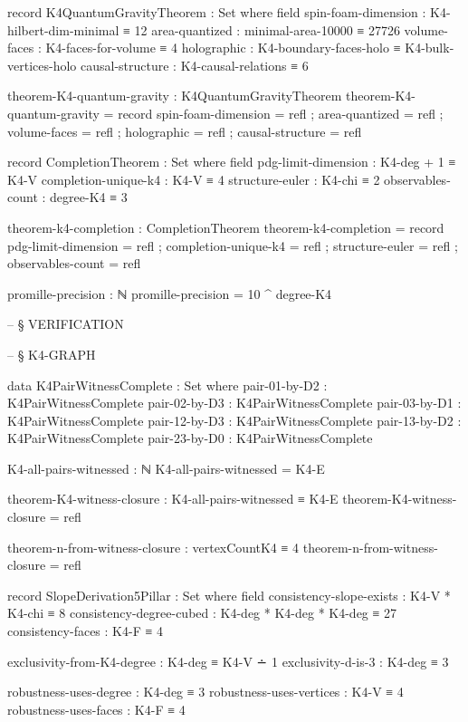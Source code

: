 \documentclass[11pt,a4paper]{book}
\begin{document}
\begin{code}
record K4QuantumGravityTheorem : Set where
  field
    spin-foam-dimension : K4-hilbert-dim-minimal ≡ 12
    area-quantized      : minimal-area-10000 ≡ 27726
    volume-faces        : K4-faces-for-volume ≡ 4
    holographic         : K4-boundary-faces-holo ≡ K4-bulk-vertices-holo
    causal-structure    : K4-causal-relations ≡ 6

theorem-K4-quantum-gravity : K4QuantumGravityTheorem
theorem-K4-quantum-gravity = record
  { spin-foam-dimension = refl
  ; area-quantized      = refl
  ; volume-faces        = refl
  ; holographic         = refl
  ; causal-structure    = refl
  }

record CompletionTheorem : Set where
  field
    pdg-limit-dimension : K4-deg + 1 ≡ K4-V
    completion-unique-k4 : K4-V ≡ 4
    structure-euler : K4-chi ≡ 2
    observables-count : degree-K4 ≡ 3

theorem-k4-completion : CompletionTheorem
theorem-k4-completion = record
  { pdg-limit-dimension = refl
  ; completion-unique-k4 = refl
  ; structure-euler = refl
  ; observables-count = refl
  }

promille-precision : ℕ
promille-precision = 10 ^ degree-K4


-- § VERIFICATION



-- § K4-GRAPH

data K4PairWitnessComplete : Set where
  pair-01-by-D2 : K4PairWitnessComplete
  pair-02-by-D3 : K4PairWitnessComplete
  pair-03-by-D1 : K4PairWitnessComplete
  pair-12-by-D3 : K4PairWitnessComplete
  pair-13-by-D2 : K4PairWitnessComplete
  pair-23-by-D0 : K4PairWitnessComplete

K4-all-pairs-witnessed : ℕ
K4-all-pairs-witnessed = K4-E

theorem-K4-witness-closure : K4-all-pairs-witnessed ≡ K4-E
theorem-K4-witness-closure = refl

theorem-n-from-witness-closure : vertexCountK4 ≡ 4
theorem-n-from-witness-closure = refl

record SlopeDerivation5Pillar : Set where
  field
    consistency-slope-exists : K4-V * K4-chi ≡ 8
    consistency-degree-cubed : K4-deg * K4-deg * K4-deg ≡ 27
    consistency-faces : K4-F ≡ 4
    
    exclusivity-from-K4-degree : K4-deg ≡ K4-V ∸ 1
    exclusivity-d-is-3 : K4-deg ≡ 3
    
    robustness-uses-degree : K4-deg ≡ 3
    robustness-uses-vertices : K4-V ≡ 4
    robustness-uses-faces : K4-F ≡ 4
    

\end{code}
\end{document}

